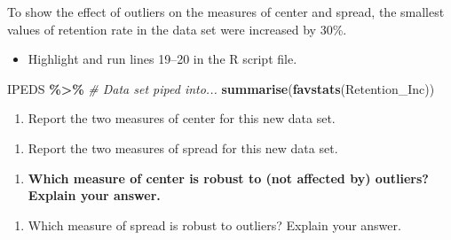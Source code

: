\documentclass[
]{report}
\newenvironment{Shaded}{\begin{snugshade}}{\end{snugshade}}
\newcommand{\CommentTok}[1]{\textcolor[rgb]{0.56,0.35,0.01}{\textit{#1}}}
\newcommand{\FunctionTok}[1]{\textcolor[rgb]{0.13,0.29,0.53}{\textbf{#1}}}
\newcommand{\NormalTok}[1]{#1}
\newcommand{\SpecialCharTok}[1]{\textcolor[rgb]{0.81,0.36,0.00}{\textbf{#1}}}
\providecommand{\tightlist}{%
  \setlength{\itemsep}{0pt}\setlength{\parskip}{0pt}}
\begin{document}
\vspace{0.4in}

To show the effect of outliers on the measures of center and spread, the smallest values of retention rate in the data set were increased by 30\%.

\begin{itemize}
\tightlist
\item
  Highlight and run lines 19--20 in the R script file.
\end{itemize}

\begin{Shaded}
\begin{Highlighting}[]
\NormalTok{IPEDS }\SpecialCharTok{\%\textgreater{}\%} \CommentTok{\# Data set piped into...}
  \FunctionTok{summarise}\NormalTok{(}\FunctionTok{favstats}\NormalTok{(Retention\_Inc))}
\end{Highlighting}
\end{Shaded}

\begin{enumerate}
\def\labelenumi{\arabic{enumi}.}
\setcounter{enumi}{7}
\tightlist
\item
  Report the two measures of center for this new data set.
\end{enumerate}

\vspace{0.4in}

\begin{enumerate}
\def\labelenumi{\arabic{enumi}.}
\setcounter{enumi}{8}
\tightlist
\item
  Report the two measures of spread for this new data set.
\end{enumerate}

\vspace{0.4in}

\begin{enumerate}
\def\labelenumi{\arabic{enumi}.}
\setcounter{enumi}{9}
\tightlist
\item
  \textbf{Which measure of center is robust to (not affected by) outliers? Explain your answer.}
\end{enumerate}

\vspace{0.5in}

\begin{enumerate}
\def\labelenumi{\arabic{enumi}.}
\setcounter{enumi}{10}
\tightlist
\item
  Which measure of spread is robust to outliers? Explain your answer.
\end{enumerate}
\end{document}
